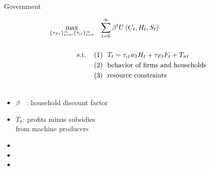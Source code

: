 \documentclass[11pt,aspectratio=169]{beamer}
\begin{document}
\begin{frame}{ Government}
\hypertarget{gov}{}
\vspace{-4mm}
\centering
\begin{minipage}[t!]{1\textwidth}
	\begin{align*}
		\max_{\{\tau_{Ft}\}_{t=0}^{\infty}, \{\tau_{\iota t}\}_{t=0}^{\infty}}&\hspace{3mm} \sum_{t=0}^{\infty}\beta^t U\left(C_t,H_t, S_t\right)\\ \ \\
		\text{s.t.} \hspace{4mm}
		&{ (1)\ \ T_t=\tau_{\iota t}w_{t}H_{t}+{{\tau_{Ft}}}F_{t}}+T_{\pi t}\\
		& {(2)\ \  \text{behavior of firms and households}}\\
		& {(3)\ \ \text{resource constraints} }\\
		& \ %
	\end{align*}
\end{minipage}

\small
\vspace{0mm}
\hspace{-10mm}
\begin{minipage}[t!]{0.5\textwidth}
	\vspace{7mm}
	\begin{itemize}
		\item[] $\beta$\ \ : household discount factor\vspace{-2mm}
		\item[] $T_\pi$: profits minus subsidies \\ \hspace{5.5mm} from machine producers \vspace{0mm}
	\end{itemize}
\end{minipage}
\begin{minipage}[t!]{0.4\textwidth}
	\vspace{8mm}
	\begin{itemize}
		\item[] %
		\vspace{-2mm}	
		\item[] %
		\item[] %
	\end{itemize}
\end{minipage}
\end{frame}
\end{document}
